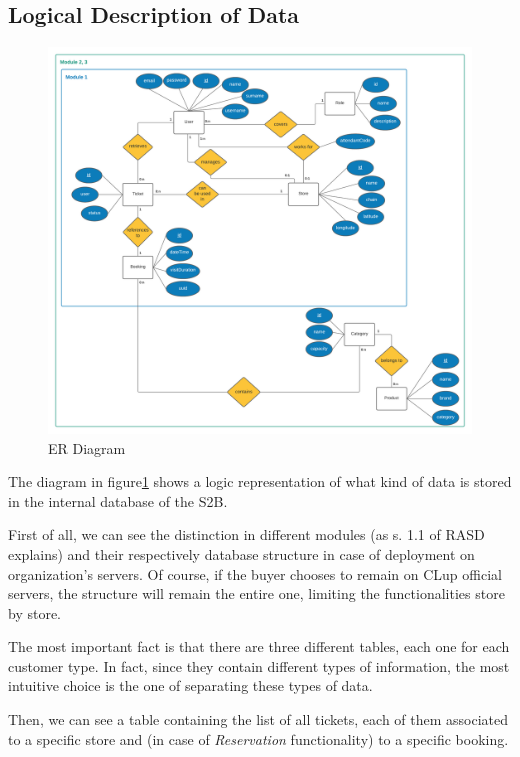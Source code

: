 \documentclass[table, 12pt]{article}
\begin{document}
\subsection{Logical Description of Data}
\begin{figure}[H]
    \begin{center}
        \includegraphics[width=\textwidth]{assets/Architectural-Design/ER.png}
        \caption{ER Diagram}\label{er_diagram}
    \end{center}
\end{figure}
The diagram in figure\ref{er_diagram} shows a logic representation of what kind of data is stored in the internal database of the S2B.

First of all, we can see the distinction in different modules (as s. 1.1 of RASD explains) and their respectively database structure in case of deployment on organization's servers. Of course, if the buyer chooses to remain on CLup official servers, the structure will remain the entire one, limiting the functionalities store by store.

The most important fact is that there are three different tables, each one for each customer type. In fact, since they contain different types of information, the most intuitive choice is the one of separating these types of data.

Then, we can see a table containing the list of all tickets, each of them associated to a specific store and (in case of \textit{Reservation} functionality) to a specific booking.
\end{document}

